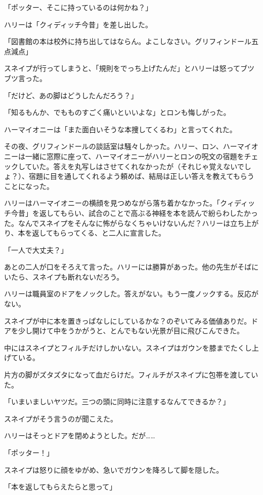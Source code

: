 \documentclass[10pt,a4paper]{article}
\begin{document}
\begin{CJK}{UTF8}{min}
「ポッター、そこに持っているのは何かね？」

ハリーは「クィディッチ今昔」を差し出した。

「図書館の本は校外に持ち出してはならん。よこしなさい。グリフィンドール五点減点」

スネイプが行ってしまうと、「規則をでっち上げたんだ」とハリーは怒ってブツブツ言った。

「だけど、あの脚はどうしたんだろう？」

「知るもんか、でもものすごく痛いといいよな」とロンも悔しがった。

ハーマイオニーは「また面白いそうな本捜してくるわ」と言ってくれた。



その夜、グリフィンドールの談話室は騒々しかった。ハリー、ロン、ハーマイオニーは一緒に窓際に座って、ハーマイオニーがハリーとロンの呪文の宿題をチェックしていた。答えを丸写しはさせてくれなかったが（それじゃ覚えないでしょ？）、宿題に目を通してくれるよう頼めば、結局は正しい答えを教えてもらうことになった。

ハリーはハーマイオニーの横顔を見つめながら落ち着かなかった。「クィディッチ今昔」を返してもらい、試合のことで高ぶる神経を本を読んで紛らわしたかった。なんでスネイプをそんなに怖がらなくちゃいけないんだ？ハリーは立ち上がり、本を返してもらってくる、と二人に宣言した。

「一人で大丈夫？」

あとの二人が口をそろえて言った。ハリーには勝算があった。他の先生がそばにいたら、スネイプも断れないだろう。

ハリーは職員室のドアをノックした。答えがない。もう一度ノックする。反応がない。

スネイプが中に本を置きっぱなしにしているかな？のぞいてみる価値ありだ。ドアを少し開けて中をうかがうと、とんでもない光景が目に飛びこんできた。

中にはスネイプとフィルチだけしかいない。スネイプはガウンを膝までたくし上げている。

片方の脚がズタズタになって血だらけだ。フィルチがスネイプに包帯を渡していた。

「いまいましいヤツだ。三つの頭に同時に注意するなんてできるか？」

スネイプがそう言うのが聞こえた。

ハリーはそっとドアを閉めようとした。だが……

「ポッター！」

スネイプは怒りに顔をゆがめ、急いでガウンを降ろして脚を隠した。

「本を返してもらえたらと思って」


\end{CJK}
\end{document}
